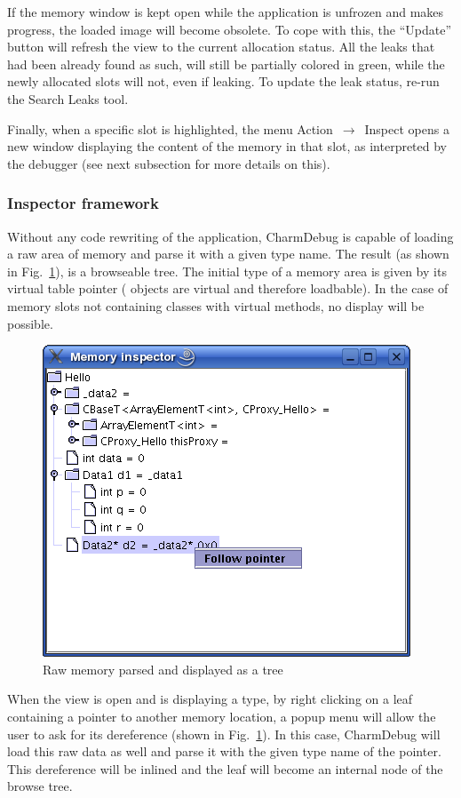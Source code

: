 If the memory window is kept open while the application is unfrozen and makes
progress, the loaded image will become obsolete. To cope with this, the
``Update'' button will refresh the view to the current allocation status. All
the leaks that had been already found as such, will still be partially colored
in green, while the newly allocated slots will not, even if leaking. To update
the leak status, re-run the Search Leaks tool.

Finally, when a specific slot is highlighted, the menu
Action~$\rightarrow$~Inspect opens a new window displaying the content of the
memory in that slot, as interpreted by the debugger (see next subsection for
more details on this).

\subsubsection{Inspector framework}
\label{sec:inspector}

Without any code rewriting of the application, CharmDebug is capable of loading
a raw area of memory and parse it with a given type name. The result (as shown
in Fig.~\ref{fig:inspect}), is a browseable tree. The initial type of a memory
area is given by its virtual table pointer (\charmpp{} objects are virtual and
therefore loadbable). In the case of memory slots not containing classes with
virtual methods, no display will be possible.

\begin{figure}[ht!]
\centering
\includegraphics[scale=0.5]{figs/memoryInspector}
\caption{Raw memory parsed and displayed as a tree}
\label{fig:inspect}
\end{figure}

When the view is open and is displaying a type, by right clicking on a leaf
containing a pointer to another memory location, a popup menu will allow the
user to ask for its dereference (shown in Fig.~\ref{fig:inspect}). In this case,
CharmDebug will load this raw data as well and parse it with the given type name
of the pointer. This dereference will be inlined and the leaf will become an
internal node of the browse tree.

